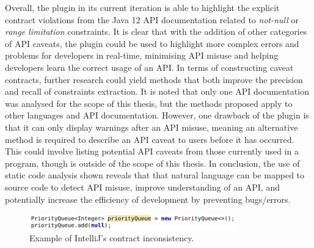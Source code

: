 Overall, the plugin in its current iteration is able to highlight the explicit contract violations from the Java 12 API documentation related to \textit{not-null} or \textit{range limitation} constraints. It is clear that with the addition of other categories of API caveats, the plugin could be used to highlight more complex errors and problems for developers in real-time, minimising API misuse and helping developers learn the correct usage of an API. In terms of constructing caveat contracts, further research could yield methods that both improve the precision and recall of constraints extraction. It is noted that only one API documentation was analysed for the scope of this thesis, but the methods proposed apply to other languages and API documentation. However, one drawback of the plugin is that it can only display warnings after an API misuse, meaning an alternative method is required to describe an API caveat to users before it has occurred.  This could involve listing potential API caveats from those currently used in a program, though is outside of the scope of this thesis. In conclusion, the use of static code analysis shown reveals that that natural language can be mapped to source code to detect API misuse, improve understanding of an API, and potentially increase the efficiency of development by preventing bugs/errors.

\begin{figure}[h]
	\label{fig:intellij-inspection-off}
	\centering
	\includegraphics[width=0.8\textwidth]{figs/intellij-inspection-off.png}
	\caption{Example of IntelliJ's contract inconsistency.}
\end{figure}

